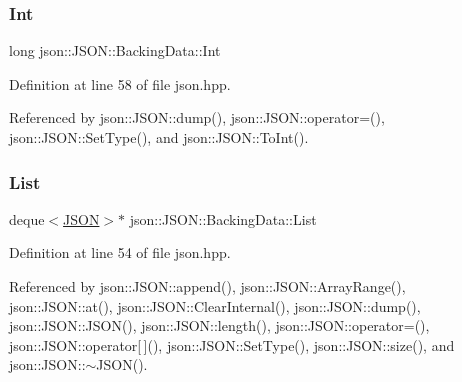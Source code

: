 \mbox{\label{unionjson_1_1_j_s_o_n_1_1_backing_data_a0d80815a70ff5bb9345f75de79ec81c3}} 
\subsubsection{\texorpdfstring{Int}{Int}}
{\footnotesize\ttfamily long json\+::\+J\+S\+O\+N\+::\+Backing\+Data\+::\+Int}



Definition at line 58 of file json.\+hpp.



Referenced by json\+::\+J\+S\+O\+N\+::dump(), json\+::\+J\+S\+O\+N\+::operator=(), json\+::\+J\+S\+O\+N\+::\+Set\+Type(), and json\+::\+J\+S\+O\+N\+::\+To\+Int().

\mbox{\label{unionjson_1_1_j_s_o_n_1_1_backing_data_ab85f5e7ad21f9f7a5407ab73128a3ebc}} 
\subsubsection{\texorpdfstring{List}{List}}
{\footnotesize\ttfamily deque$<$\mbox{\hyperlink{classjson_1_1_j_s_o_n}{J\+S\+ON}}$>$$\ast$ json\+::\+J\+S\+O\+N\+::\+Backing\+Data\+::\+List}



Definition at line 54 of file json.\+hpp.



Referenced by json\+::\+J\+S\+O\+N\+::append(), json\+::\+J\+S\+O\+N\+::\+Array\+Range(), json\+::\+J\+S\+O\+N\+::at(), json\+::\+J\+S\+O\+N\+::\+Clear\+Internal(), json\+::\+J\+S\+O\+N\+::dump(), json\+::\+J\+S\+O\+N\+::\+J\+S\+O\+N(), json\+::\+J\+S\+O\+N\+::length(), json\+::\+J\+S\+O\+N\+::operator=(), json\+::\+J\+S\+O\+N\+::operator\mbox{[}$\,$\mbox{]}(), json\+::\+J\+S\+O\+N\+::\+Set\+Type(), json\+::\+J\+S\+O\+N\+::size(), and json\+::\+J\+S\+O\+N\+::$\sim$\+J\+S\+O\+N().

\mbox{\label{unionjson_1_1_j_s_o_n_1_1_backing_data_ab2e19b00745b37d2add157ff3a35c431}} 

